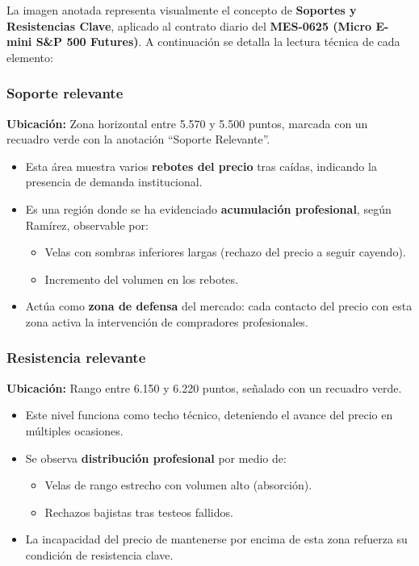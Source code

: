 La imagen anotada representa visualmente el concepto de \textbf{Soportes y Resistencias Clave}, aplicado al contrato diario del \textbf{MES-0625 (Micro E-mini S\&P 500 Futures)}. A continuaci\'on se detalla la lectura t\'ecnica de cada elemento:

\subsubsection*{Soporte relevante}

\textbf{Ubicaci\'on:} Zona horizontal entre 5.570 y 5.500 puntos, marcada con un recuadro verde con la anotaci\'on ``Soporte Relevante''.

\begin{itemize}
    \item Esta \'area muestra varios \textbf{rebotes del precio} tras ca\'idas, indicando la presencia de demanda institucional.
    \item Es una regi\'on donde se ha evidenciado \textbf{acumulaci\'on profesional}, seg\'un Ram\'irez, observable por:
    \begin{itemize}
        \item Velas con sombras inferiores largas (rechazo del precio a seguir cayendo).
        \item Incremento del volumen en los rebotes.
    \end{itemize}
    \item Act\'ua como \textbf{zona de defensa} del mercado: cada contacto del precio con esta zona activa la intervenci\'on de compradores profesionales.
\end{itemize}

\subsubsection*{Resistencia relevante}

\textbf{Ubicaci\'on:} Rango entre 6.150 y 6.220 puntos, señalado con un recuadro verde.

\begin{itemize}
    \item Este nivel funciona como techo t\'ecnico, deteniendo el avance del precio en m\'ultiples ocasiones.
    \item Se observa \textbf{distribuci\'on profesional} por medio de:
    \begin{itemize}
        \item Velas de rango estrecho con volumen alto (absorci\'on).
        \item Rechazos bajistas tras testeos fallidos.
    \end{itemize}
    \item La incapacidad del precio de mantenerse por encima de esta zona refuerza su condici\'on de resistencia clave.
\end{itemize}

